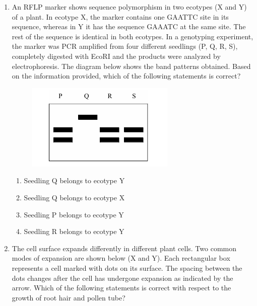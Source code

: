 \documentclass[journal,12pt,onecolumn]{IEEEtran}
\begin{document}
\begin{enumerate}[label=\arabic*.,resume]
\begin{multicols}{2}
\begin{enumerate}[label=(\Alph*)]
\item P1
\item P2
\item P3
\item P4
\end{enumerate}
\end{multicols}

\item An RFLP marker shows sequence polymorphism in two ecotypes (X and Y) of a plant. In ecotype X, the marker contains one GAATTC site in its sequence, whereas in Y it has the sequence GAAATC at the same site. The rest of the sequence is identical in both ecotypes. In a genotyping experiment, the marker was PCR amplified from four different seedlings (P, Q, R, S), completely digested with EcoRI and the products were analyzed by electrophoresis. The diagram below shows the band patterns obtained. Based on the information provided, which of the following statements is correct?

\begin{figure}[H]
\centering
\includegraphics[width=0.6\columnwidth]{FIG/J-15.png}
\caption*{}
\label{fig:J-15}
\end{figure}

\begin{multicols}{2}
\begin{enumerate}[label=(\Alph*)]
\item Seedling Q belongs to ecotype Y
\item Seedling Q belongs to ecotype X
\item Seedling P belongs to ecotype Y
\item Seedling R belongs to ecotype Y
\end{enumerate}
\end{multicols}

\item The cell surface expands differently in different plant cells. Two common modes of expansion are shown below (X and Y). Each rectangular box represents a cell marked with dots on its surface. The spacing between the dots changes after the cell has undergone expansion as indicated by the arrow. Which of the following statements is correct with respect to the growth of root hair and pollen tube?


\end{enumerate}
\end{document}
